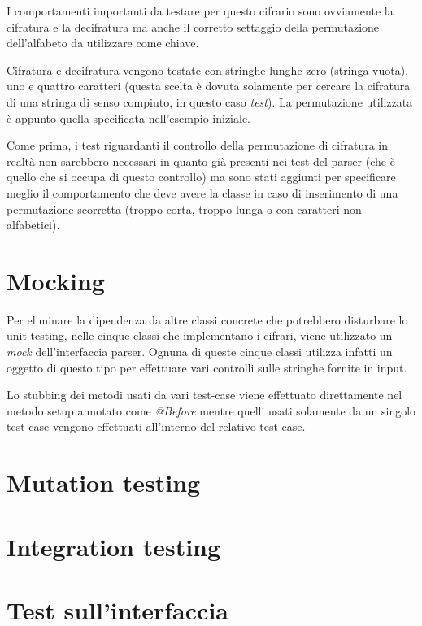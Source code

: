 			I comportamenti importanti da testare per questo cifrario sono ovviamente la cifratura e la decifratura ma anche il corretto settaggio della permutazione dell'alfabeto da utilizzare come chiave.
			
			Cifratura e decifratura vengono testate con stringhe lunghe zero (stringa vuota), uno e quattro caratteri (questa scelta è dovuta solamente per cercare la cifratura di una stringa di senso compiuto, in questo caso \emph{test}). La permutazione utilizzata è appunto quella specificata nell'esempio iniziale.
			
			Come prima, i test riguardanti il controllo della permutazione di cifratura in realtà non sarebbero necessari in quanto già presenti nei test del parser (che è quello che si occupa di questo controllo) ma sono stati aggiunti per specificare meglio il comportamento che deve avere la classe in caso di inserimento di una permutazione scorretta (troppo corta, troppo lunga o con caratteri non alfabetici).
			
	\section{Mocking}
		Per eliminare la dipendenza da altre classi concrete che potrebbero disturbare lo unit-testing, nelle cinque classi che implementano i cifrari, viene utilizzato un \emph{mock} dell'interfaccia parser.	Ognuna di queste cinque classi utilizza infatti un oggetto di questo tipo per effettuare vari controlli sulle stringhe fornite in input.
		
		Lo stubbing dei metodi usati da vari test-case viene effettuato direttamente nel metodo setup annotato come \emph{@Before} mentre quelli usati solamente da un singolo test-case vengono effettuati all'interno del relativo test-case.
		
	\section{Mutation testing}
	\section{Integration testing}
	\section{Test sull'interfaccia}